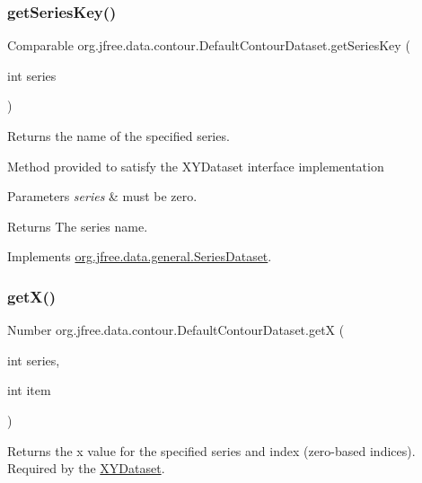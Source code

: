 \subsubsection{\texorpdfstring{get\+Series\+Key()}{getSeriesKey()}}
{\footnotesize\ttfamily Comparable org.\+jfree.\+data.\+contour.\+Default\+Contour\+Dataset.\+get\+Series\+Key (\begin{DoxyParamCaption}\item[{int}]{series }\end{DoxyParamCaption})}

Returns the name of the specified series.

Method provided to satisfy the X\+Y\+Dataset interface implementation


\begin{DoxyParams}{Parameters}
{\em series} & must be zero.\\
\hline
\end{DoxyParams}
\begin{DoxyReturn}{Returns}
The series name. 
\end{DoxyReturn}


Implements \mbox{\hyperlink{interfaceorg_1_1jfree_1_1data_1_1general_1_1_series_dataset_a60488892b2314a05a012999e26a74178}{org.\+jfree.\+data.\+general.\+Series\+Dataset}}.

\mbox{\label{classorg_1_1jfree_1_1data_1_1contour_1_1_default_contour_dataset_a4971da895c3ca3722fbf01cc40dd9124}} 
\subsubsection{\texorpdfstring{get\+X()}{getX()}}
{\footnotesize\ttfamily Number org.\+jfree.\+data.\+contour.\+Default\+Contour\+Dataset.\+getX (\begin{DoxyParamCaption}\item[{int}]{series,  }\item[{int}]{item }\end{DoxyParamCaption})}

Returns the x value for the specified series and index (zero-\/based indices). Required by the \mbox{\hyperlink{}{X\+Y\+Dataset}}.


